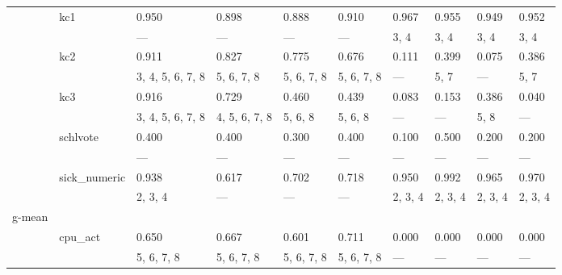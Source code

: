 \documentclass{article}
\begin{document}
\begin{center}
\begin{longtable}{p{1.2cm}p{1.8cm}p{1cm}p{1cm}p{1cm}p{1cm}p{1cm}p{1cm}p{1cm}p{1cm}}
             & kc1          & 0.950            & 0.898         & 0.888         & 0.910         & 0.967         & 0.955      & 0.949            & 0.952         \\
             &              & ---              & ---           & ---           & ---           & 3, 4          & 3, 4       & 3, 4             & 3, 4          \\
             & kc2          & 0.911            & 0.827         & 0.775         & 0.676         & 0.111         & 0.399      & 0.075            & 0.386         \\
             &              & 3, 4, 5, 6, 7, 8 & 5, 6, 7, 8    & 5, 6, 7, 8    & 5, 6, 7, 8    & ---           & 5, 7       & ---              & 5, 7          \\
             & kc3          & 0.916            & 0.729         & 0.460         & 0.439         & 0.083         & 0.153      & 0.386            & 0.040         \\
             &              & 3, 4, 5, 6, 7, 8 & 4, 5, 6, 7, 8 & 5, 6, 8       & 5, 6, 8       & ---           & ---        & 5, 8             & ---           \\
             & schlvote     & 0.400            & 0.400         & 0.300         & 0.400         & 0.100         & 0.500      & 0.200            & 0.200         \\
             &              & ---              & ---           & ---           & ---           & ---           & ---        & ---              & ---           \\
             & sick\_numeric & 0.938            & 0.617         & 0.702         & 0.718         & 0.950         & 0.992      & 0.965            & 0.970         \\
             &              & 2, 3, 4          & ---           & ---           & ---           & 2, 3, 4       & 2, 3, 4    & 2, 3, 4          & 2, 3, 4       \\
 g-mean      &              &                  &               &               &               &               &            &                  &               \\
             & cpu\_act      & 0.650            & 0.667         & 0.601         & 0.711         & 0.000         & 0.000      & 0.000            & 0.000         \\
             &              & 5, 6, 7, 8       & 5, 6, 7, 8    & 5, 6, 7, 8    & 5, 6, 7, 8    & ---           & ---        & ---              & ---           \\

\end{longtable}
\end{center}
\end{document}
